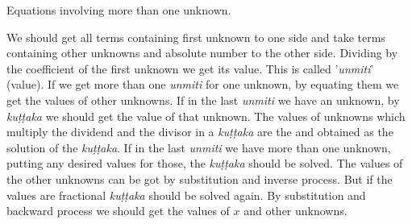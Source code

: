 \documentclass[]{article}
\begin{document}
\begin{center}
\vspace{4pt}
\begin{Large}
 \label{an}
{}
\end{Large}
\end{center}
\vspace{10pt}
{Equations involving more than one unknown.}

\begin{quote}  {}
\end{quote}

We should get all terms containing first unknown to one side and take terms containing other unknowns and absolute number to the other side. Dividing by the coefficient of the first unknown we get its value. This is called '\textit{unmiti}' (value). If we get more than one \textit{unmiti} for one unknown, by equating them we get the values of other unknowns. If in the last \textit{unmiti} we have an unknown, by \textit{kuṭṭaka} we should get the value of that unknown. The values of unknowns which multiply the dividend and the divisor in a \textit{kuṭṭaka} are the {} and {} obtained as the solution of the \textit{kuṭṭaka}. If in the last \textit{unmiti} we have more than one unknown, putting any desired values for those, the \textit{kuṭṭaka} should be solved. The values of the other unknowns can be got by substitution and inverse process. But if the values are fractional \textit{kuṭṭaka} should be solved again. By substitution and backward process we should get the values of $x$ and other unknowns.

\begin{quote}  {}  \end{quote}
\newpage
\large
\end{document}
